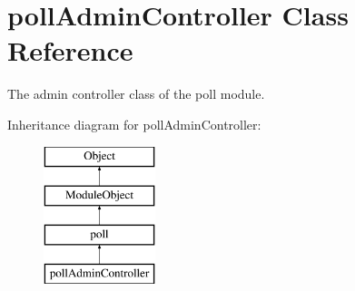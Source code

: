 \hypertarget{classpollAdminController}{\section{poll\+Admin\+Controller Class Reference}
\label{classpollAdminController}
}


The admin controller class of the poll module.  


Inheritance diagram for poll\+Admin\+Controller\+:\begin{figure}[H]
\begin{center}
\leavevmode
\includegraphics[height=4.000000cm]{classpollAdminController}
\end{center}
\end{figure}
